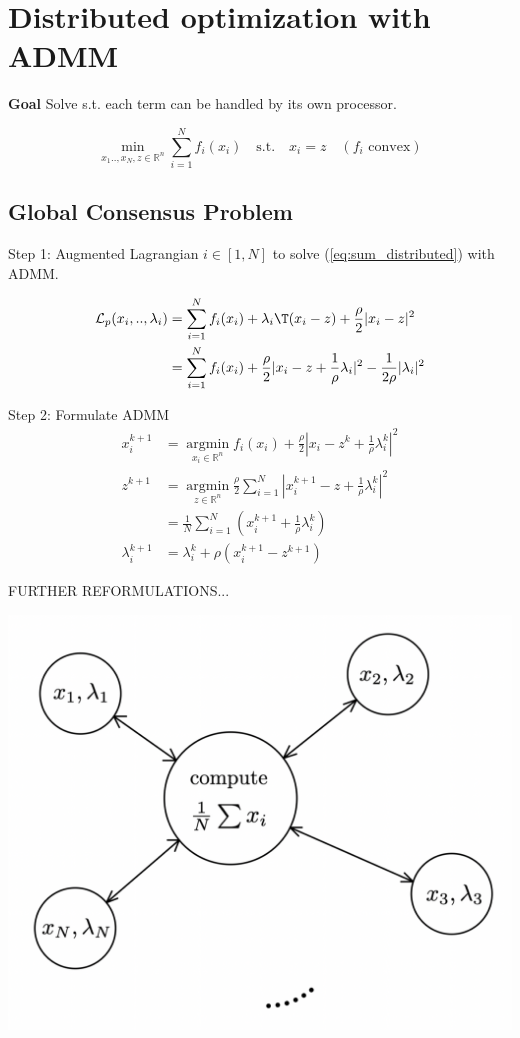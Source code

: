 
\section{Distributed optimization with ADMM}

\textbf{Goal}
Solve s.t. each term can be handled by its own processor.

\begin{equation}
	\min_{x_1..,x_N, z \in \mathbb{R}^{n}}
	\sum_{i = 1}^{N} f_i(x_i)
	\quad\text{s.t.}\quad x_i=z
	\quad(f_i \text{ convex})
	\label{eq:sum_distributed}
\end{equation}

\subsection{Global Consensus Problem}

Step 1: Augmented Lagrangian $i\in[1,N]$
to solve (\ref{eq:sum_distributed}) with ADMM.

$$\begin{aligned}
		\mathcal{L}_p(x_i,..,\lambda_i) & =
		\sum_{i=1}^{N}f_i(x_i)
		+\lambda_i\T(x_i-z)+\frac{\rho}{2}|x_i-z|^2
		\\
		                                & =\sum_{i=1}^{N}f_i(x_i)
		+\frac{\rho}{2}|x_i-z+\frac{1}{\rho}\lambda_i|^2-\frac{1}{2\rho}|\lambda_i|^2
	\end{aligned}$$

Step 2: Formulate ADMM
$$\begin{aligned}
		x_i^{k+1} & = \underset{x_i\in\mathbb{R}^{n}}{\operatorname{argmin}}
		f_i(x_i)+\frac{\rho}{2}|x_i-z^k+\frac{1}{\rho}\lambda_i^k|^2
		\\
		z^{k+1}   & = \underset{z\in\mathbb{R}^{n}}{\operatorname{argmin}}
		\frac{\rho}{2}\sum_{i=1}^{N}
		|x_i^{k+1}-z+\frac{1}{\rho}\lambda_i^k|^2
		\\&=\frac{1}{N}\sum_{i=1}^{N}
		(x_i^{k+1}+\frac{1}{\rho}\lambda_i^k)
		\\
		\lambda_i^{k+1}
		          & =\lambda_i^k+\rho(x_i^{k+1}-z^{k+1})
	\end{aligned}$$

FURTHER REFORMULATIONS...

\includegraphics[width=0.8\columnwidth]{images/distributed.png}

